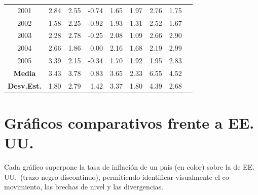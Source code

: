 \documentclass[12pt, letterpaper]{article}
\theoremstyle{remark}
\begin{document}
\begin{datebox}
\begin{tabular}{crrrrrrrr}
2001 &  2.84 &  2.55 & -0.74 &  1.65 &  1.97 &  2.76 &  1.75 \\
2002 &  1.58 &  2.25 & -0.92 &  1.93 &  1.31 &  2.52 &  1.67 \\
2003 &  2.28 &  2.78 & -0.25 &  2.08 &  1.09 &  2.66 &  2.90 \\
2004 &  2.66 &  1.86 &  0.00 &  2.16 &  1.68 &  2.19 &  2.99 \\
2005 &  3.39 &  2.15 & -0.34 &  1.70 &  1.92 &  1.95 &  2.83 \\
\midrule
\textbf{Media}  & 3.43 & 3.78 & 0.83 & 3.65 & 2.33 & 6.55 & 4.52 \\
\textbf{Desv.Est.} & 1.80 & 2.79 & 1.42 & 3.37 & 1.80 & 4.39 & 2.68 \\
\bottomrule
\end{tabular}
\end{datebox}

\section{Gr\'aficos comparativos frente a EE.\,UU.}

Cada gr\'afico superpone la tasa de inflaci\'on de un pa\'is (en color)
sobre la de EE.\,UU.\ (trazo negro discontinuo), permitiendo identificar
visualmente el co-movimiento, las brechas de nivel y las divergencias.

\newcommand{\plotUSA}{
  \addplot[color=col_usa, thick, dashed, mark=none] coordinates {
    (1981,10.32)(1982,6.16)(1983,3.21)(1984,4.32)(1985,3.56)
    (1986,1.86)(1987,3.65)(1988,4.14)(1989,4.82)(1990,5.40)
    (1991,4.21)(1992,3.01)(1993,2.99)(1994,2.56)(1995,2.83)
    (1996,2.95)(1997,2.29)(1998,1.56)(1999,2.21)(2000,3.37)
    (2001,2.84)(2002,1.58)(2003,2.28)(2004,2.66)(2005,3.39)
  };
  \addlegendentry{EE.\,UU.\ (ref.)}
}
\end{document}

